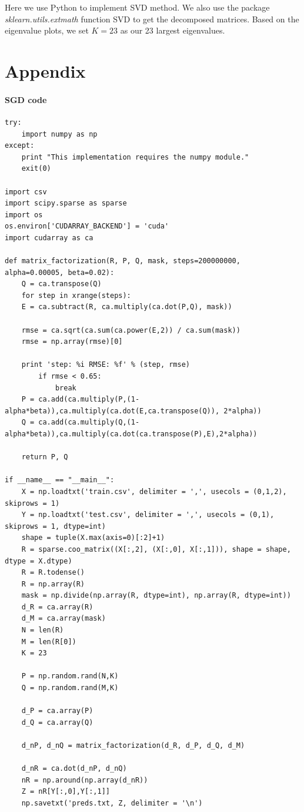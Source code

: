 \documentclass{article}
\begin{document}
Here we use Python to implement SVD method. We also use the package \textit{sklearn.utils.extmath} function SVD to get the decomposed matrices. Based on the eigenvalue plots, we set $K=23$ as our 23 largest eigenvalues.


\section{Appendix}
\label{code}
\paragraph{SGD code}
\begin{verbatim}  
try:
    import numpy as np
except:
    print "This implementation requires the numpy module."
    exit(0)

import csv
import scipy.sparse as sparse
import os
os.environ['CUDARRAY_BACKEND'] = 'cuda'
import cudarray as ca

def matrix_factorization(R, P, Q, mask, steps=200000000, alpha=0.00005, beta=0.02):
    Q = ca.transpose(Q)
    for step in xrange(steps):
 	E = ca.subtract(R, ca.multiply(ca.dot(P,Q), mask))

	rmse = ca.sqrt(ca.sum(ca.power(E,2)) / ca.sum(mask))
	rmse = np.array(rmse)[0]

 	print 'step: %i RMSE: %f' % (step, rmse)
        if rmse < 0.65:
            break
	P = ca.add(ca.multiply(P,(1-alpha*beta)),ca.multiply(ca.dot(E,ca.transpose(Q)), 2*alpha))
	Q = ca.add(ca.multiply(Q,(1-alpha*beta)),ca.multiply(ca.dot(ca.transpose(P),E),2*alpha))

    return P, Q
    
if __name__ == "__main__":
    X = np.loadtxt('train.csv', delimiter = ',', usecols = (0,1,2), skiprows = 1)
    Y = np.loadtxt('test.csv', delimiter = ',', usecols = (0,1), skiprows = 1, dtype=int)
    shape = tuple(X.max(axis=0)[:2]+1)
    R = sparse.coo_matrix((X[:,2], (X[:,0], X[:,1])), shape = shape, dtype = X.dtype)
    R = R.todense()
    R = np.array(R)
    mask = np.divide(np.array(R, dtype=int), np.array(R, dtype=int))
    d_R = ca.array(R)
    d_M = ca.array(mask)
    N = len(R)
    M = len(R[0])
    K = 23

    P = np.random.rand(N,K)
    Q = np.random.rand(M,K)

    d_P = ca.array(P)
    d_Q = ca.array(Q)

    d_nP, d_nQ = matrix_factorization(d_R, d_P, d_Q, d_M)

    d_nR = ca.dot(d_nP, d_nQ)
    nR = np.around(np.array(d_nR))
    Z = nR[Y[:,0],Y[:,1]]
    np.savetxt('preds.txt, Z, delimiter = '\n')
\end{verbatim}  
\end{document}
